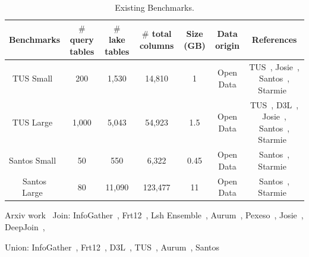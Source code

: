 {\scriptsize
    \begin{table}[t]
        \centering
        \caption{Existing Benchmarks.}
        \vspace{-3.5ex}
        \begin{tabular}{c|c|c|c|c|c|c}
            \hline
            \centering
            Benchmarks & $\#$ query tables & $\#$ lake tables & $\#$ total columns & Size (GB) & Data origin & References \\
            \hline
            TUS Small~\cite{TUS} & 200 & 1,530 & 14,810 & 1 & Open Data & TUS~\cite{TUS}, Josie~\cite{Josie}, Santos~\cite{Santos}, Starmie~\cite{Starmie} \\
            \hline
            TUS Large~\cite{TUS} & 1,000 & 5,043 & 54,923 & 1.5 & Open Data & TUS~\cite{TUS}, D3L~\cite{D3L}, Josie~\cite{Josie}, Santos~\cite{Santos}, Starmie~\cite{Starmie} \\
            \hline
            Santos Small~\cite{Santos} & 50 & 550 & 6,322 & 0.45 & Open Data & Santos~\cite{Santos}, Starmie~\cite{Starmie} \\
            \hline
            Santos Large~\cite{Santos} & 80 & 11,090 & 123,477 & 11 & Open Data & Santos~\cite{Santos}, Starmie~\cite{Starmie} \\
            \hline
        \end{tabular}
        \label{Table:benchmarks}
        \vspace{-4ex}
    \end{table}
}

Arxiv work~\cite{LakeBench}
Join: 
InfoGather~\cite{InfoGather}, 
Frt12~\cite{Frt12}, 
Lsh Ensemble~\cite{LshEn}, 
Aurum~\cite{Aurum, SemProp}, 
Pexeso~\cite{Pexeso}, 
Josie~\cite{Josie}, 
DeepJoin~\cite{DeepJoin}, 






Union: 
InfoGather~\cite{InfoGather}, 
Frt12~\cite{Frt12}, 
D3L~\cite{D3L},
TUS~\cite{TUS}, 
Aurum~\cite{Aurum, SemProp}, 
Santos~\cite{Santos}
\fi



